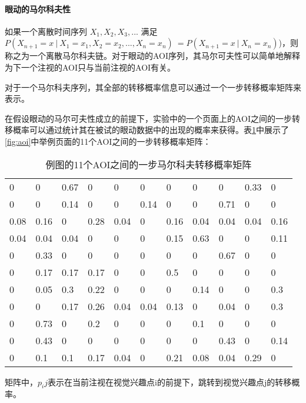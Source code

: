\paragraph{眼动的马尔科夫性}
如果一个离散时间序列 $X_1,X_2,X_3,...$ 满足$P(X_{n+1}=x~|~X_1=x_1,X_2=x_2,...,X_n=x_n)~=P(X_{n+1}=x~|~X_n=x_n)$)，则称之为一个离散马尔科夫链。对于眼动的AOI序列，其马尔可夫性可以简单地解释为下一个注视的AOI只与当前注视的AOI有关。

对于一个马尔科夫序列，其全部的转移概率信息可以通过一个一步转移概率矩阵来表示。

在假设眼动的马尔可夫性成立的前提下，实验中的一个页面上的AOI之间的一步转移概率可以通过统计其在被试的眼动数据中的出现的概率来获得。表\ref{tab:mat}中展示了\ref{fig:aoi}中举例页面的11个AOI之间的一步转移概率矩阵：

\begin{table}[H]
\centering
  \begin{tabular}{@{}lllllllllll@{}}
  \hline
  0    & 0    & 0.67 & 0    & 0    & 0    & 0    & 0    & 0    & 0.33 & 0    \\
  0    & 0    & 0.14 & 0    & 0    & 0.14 & 0    & 0    & 0.71 & 0    & 0    \\
  0.08 & 0.16 & 0    & 0.28 & 0.04 & 0    & 0.16 & 0.04 & 0.04 & 0.04 & 0.16 \\
  0.04 & 0.04 & 0.04 & 0    & 0    & 0    & 0.15 & 0.63 & 0    & 0    & 0.11 \\
  0    & 0.33 & 0    & 0    & 0    & 0    & 0    & 0    & 0.67 & 0    & 0    \\
  0    & 0.17 & 0.17 & 0.17 & 0    & 0    & 0.5  & 0    & 0    & 0    & 0    \\
  0    & 0.05 & 0.3  & 0.22 & 0    & 0    & 0    & 0.14 & 0    & 0    & 0.3  \\
  0    & 0    & 0.17 & 0.26 & 0.04 & 0.04 & 0.13 & 0    & 0.04 & 0    & 0.3  \\
  0    & 0.73 & 0    & 0.2  & 0    & 0    & 0    & 0.1  & 0    & 0    & 0    \\
  0    & 0.43 & 0    & 0    & 0    & 0    & 0    & 0    & 0.43 & 0    & 0.14 \\
  0    & 0.1  & 0.1  & 0.17 & 0.04 & 0    & 0.21 & 0.08 & 0.04 & 0.29 & 0\\
  \hline
  \end{tabular}
\caption{例图的11个AOI之间的一步马尔科夫转移概率矩阵}
\label{tab:mat}
\end{table}

矩阵中，$p_ij$表示在当前注视在视觉兴趣点i的前提下，跳转到视觉兴趣点j的转移概率。

